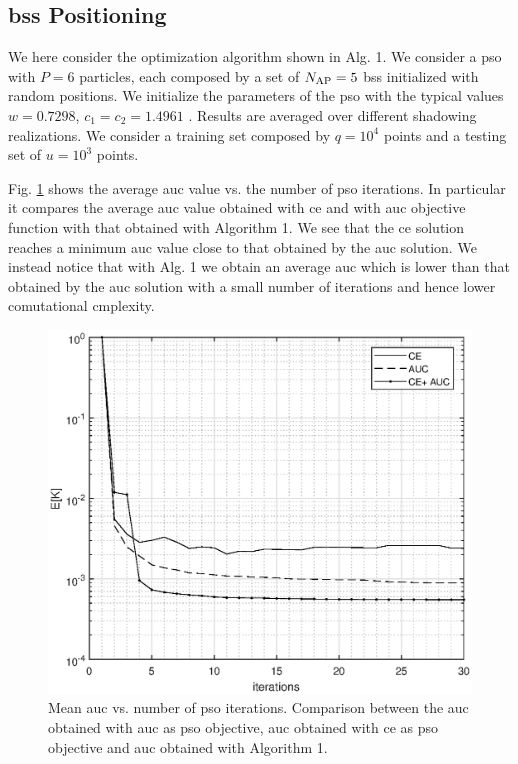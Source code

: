 \documentclass[twocolumns]{IEEEtran}
\begin{document}
\subsection{\acp{bs} Positioning}
We here consider the optimization algorithm shown in Alg. 1. We consider a \ac{pso} with $P=6$ particles, each composed by a set of $N_{\rm AP}=5$ \acp{bs} initialized with random positions. We initialize the parameters of the \ac{pso} with the typical values $w=0.7298$, $c_1=c_2=1.4961$ \cite{Kennedy-11}. Results are averaged over different shadowing realizations. We consider a training set composed by $q=10^4$ points and a testing set of $u=10^3$ points.

Fig. \ref{fig:CEvsAUC} shows the average \ac{auc} value vs. the number of \ac{pso} iterations. In particular it compares the average \ac{auc} value obtained with \ac{ce} and with \ac{auc} objective function with that obtained with Algorithm 1. We see that the \ac{ce} solution reaches a minimum \ac{auc} value close to that obtained by the \ac{auc} solution. We instead notice that with Alg. 1 we obtain an average \ac{auc} which is lower than that obtained by the \ac{auc} solution with a small number of iterations and hence lower comutational cmplexity.

\begin{figure}[t]
    \centering
    \includegraphics[width=1\columnwidth]{CE_vsAUC.eps}
    \caption{Mean \ac{auc} vs. number of \ac{pso} iterations. Comparison between the \ac{auc} obtained with \ac{auc} as \ac{pso} objective, \ac{auc} obtained with \ac{ce} as \ac{pso} objective and \ac{auc} obtained with Algorithm 1. }
    \label{fig:CEvsAUC}
\end{figure}
\end{document}
